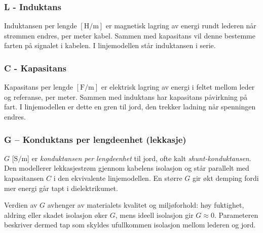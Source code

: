 \subsubsection{L - Induktans}
Induktansen per lengde $[\mathrm{H}/\mathrm{m}]$ er magnetisk lagring av energi rundt lederen når strømmen endres, per meter kabel. Sammen med kapasitans vil denne bestemme farten på signalet i kabelen. I linjemodellen står induktansen i serie.

\subsubsection{C - Kapasitans}
Kapasitans per lengde $[\mathrm{F}/\mathrm{m}]$ er elektrisk lagring av energi i feltet mellom leder og referanse, per meter. Sammen med induktans har kapasitans påvirkning på fart. I linjemodellen er dette en gren til jord, den trekker ladning når spenningen endres.

\subsubsection{G -- Konduktans per lengdeenhet (lekkasje)}
$G$ [$\mathrm{S/m}$] er \textit{konduktansen per lengdeenhet} til jord, ofte kalt 
\textit{shunt-konduktansen}. Den modellerer lekkasjestrøm gjennom kabelens isolasjon og står 
parallelt med kapasitansen $C$ i den ekvivalente linjemodellen. En større $G$ gir økt demping 
fordi mer energi går tapt i dielektrikumet. 

Verdien av $G$ avhenger av materialets kvalitet og miljøforhold: høy fuktighet, aldring eller 
skadet isolasjon øker $G$, mens ideell isolasjon gir $G \approx 0$. Parameteren beskriver dermed 
tap som skyldes ufullkommen isolasjon mellom lederen og jord.
\clearpage
